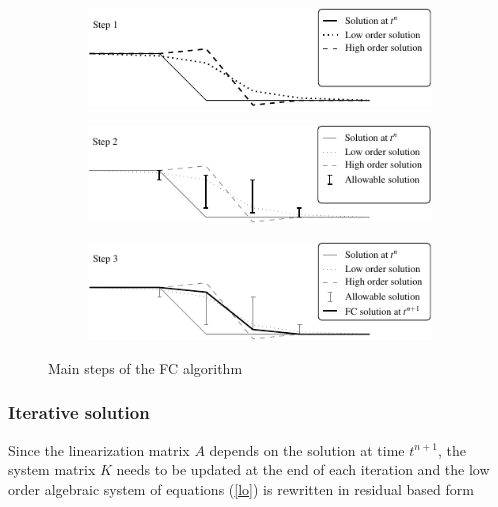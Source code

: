 \begin{figure}
\centering
\begin{subfigure}{.8\textwidth}
    \includegraphics[width=\textwidth]{img/eulerian/fc/fc_step_1.pdf}
    \vspace{1em}
\end{subfigure}
\begin{subfigure}{.8\textwidth}
    \includegraphics[width=\textwidth]{img/eulerian/fc/fc_step_2.pdf}
    \vspace{1em}
\end{subfigure}
\begin{subfigure}{.8\textwidth}
    \includegraphics[width=\textwidth]{img/eulerian/fc/fc_step_3.pdf}
\end{subfigure}
\caption{Main steps of the FC algorithm}
\label{sw_fc_steps}
\end{figure}



\subsubsection{Iterative solution}

Since the linearization matrix $A$ depends on the solution at time $t^{n+1}$, the system matrix $K$ needs to be updated at the end of each iteration and the low order algebraic system of equations (\ref{lo}) is rewritten in residual based form

